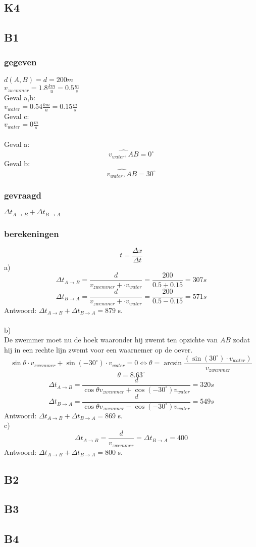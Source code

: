 \documentclass[10pt,a4paper]{article}
\begin{document}
\subsection{K4}

\subsection{B1}
\subsubsection*{gegeven}
$d(A,B) = d = 200m$\\
$v_{zwemmer}=1.8\frac{km}{u}=0.5\frac{m}{s}$\\
Geval a,b:\\
$v_{water}= 0.54\frac{km}{u}=0.15\frac{m}{s}$\\
Geval c:\\
$v_{water}= 0\frac{m}{s}$\\\\
Geval a: \[\widehat{v_{water},AB} = 0^\circ\]
Geval b: \[\widehat{v_{water},AB} = 30^\circ\]

\subsubsection*{gevraagd}
$\Delta t_{A\rightarrow B} + \Delta t_{B\rightarrow A}$

\subsubsection*{berekeningen}
\[
t = \frac{\Delta x}{\Delta t}
\]
a)\\
\[
\Delta t_{A\rightarrow B} = \frac{d}{v_{zwemmer} + \cdot v_{water}} = \frac{200}{0.5+0.15} = 307 s
\]
\[
\Delta t_{B\rightarrow A} = \frac{d}{v_{zwemmer} + \cdot v_{water}} = \frac{200}{0.5-0.15} = 571 s
\]
Antwoord:
$\Delta t_{A\rightarrow B} + \Delta t_{B\rightarrow A} = 879$ s.\\\\
b)\\
De zwemmer moet nu de hoek waaronder hij zwemt ten opzichte van $AB$ zodat hij in een rechte lijn zwemt voor een waarnemer op de oever.
\[
\sin{\theta}\cdot v_{zwemmer} + \sin{(-30^\circ)}\cdot v_{water} = 0 \Leftrightarrow \theta=\arcsin{\frac{(\sin{(30^\circ)}\cdot v_{water})}{v_{zwemmer}}}
\]
\[
\theta = 8.63^\circ
\]
\[
\Delta t_{A\rightarrow B} = \frac{d}{\cos{\theta}v_{zwemmer} + \cos{(-30^\circ)}v_{water}}=320 s
\]
\[
\Delta t_{B\rightarrow A} = \frac{d}{\cos{\theta}v_{zwemmer} - \cos{(-30^\circ)}v_{water}}=549 s
\]
Antwoord:
$\Delta t_{A\rightarrow B} + \Delta t_{B\rightarrow A} = 869$ s.\\
c)\\
\[
\Delta t_{A\rightarrow B} = \frac{d}{v_{zwemmer}} = \Delta t_{B\rightarrow A} = 400
\]
Antwoord:
$\Delta t_{A\rightarrow B} + \Delta t_{B\rightarrow A} = 800$ s.\\

\subsection{B2}

\subsection{B3}

\subsection{B4}
\end{document}
